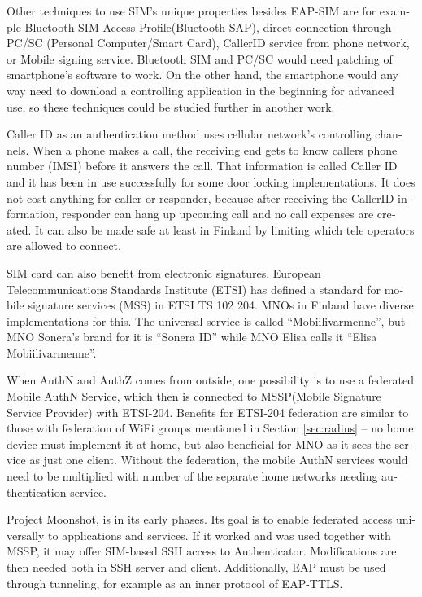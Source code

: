 \documentclass[12pt,a4paper,english]{tutthesis}
\begin{document}
\begin{otherlanguage}{english}
Other techniques  to use SIM's unique properties besides EAP-SIM
are for example Bluetooth SIM Access Profile(Bluetooth  SAP), 
direct connection through PC/SC (Personal\- Computer/Smart\- Card),
CallerID service from phone network, or
Mobile signing service.
Bluetooth SIM and PC/SC would need patching of smartphone's software
to work.  On the other hand, the smartphone would any way need to
download  a controlling application
in the beginning for advanced use, so these techniques could be
studied further in another work.

Caller ID as an authentication method uses cellular network's controlling
channels. When a phone makes a call, the receiving end gets 
to know callers phone number (IMSI) before it answers the call.
That information is called Caller ID and it has been in use
successfully for some door locking implementations. 
It does not cost anything for caller or responder,
because after receiving the CallerID  information, responder can hang
up upcoming call and no call expenses are created.
 It can also be made safe at least in Finland
by limiting which tele operators are allowed to connect.














SIM card can also benefit from electronic signatures.
European Telecommunications Standards Institute (ETSI) has defined a
standard for mobile signature services (MSS) in ETSI TS 102 204.
MNOs in Finland have diverse implementations for this. The universal 
service is called ``Mobiilivarmenne'', but MNO Sonera's brand for it
is ``Sonera ID'' while MNO Elisa calls it ``Elisa Mobiilivarmenne''.

When AuthN and AuthZ comes from outside, one possibility is to use a
federated Mobile AuthN Service, which then is connected to  MSSP(Mobile
Signature Service Provider) with ETSI-204. Benefits for ETSI-204
federation are similar to those with federation of WiFi groups
mentioned in Section \ref{sec:radius} -- no home device must implement it at home,
but also beneficial for  MNO as it sees the service as just one
client.  Without the federation, the mobile AuthN services would need to be
multiplied with number of the separate home networks  needing authentication service.



Project Moonshot\cite{moonshot}, is in its early phases. Its goal is
to enable federated access universally to applications and
services. If it worked and was used together with MSSP, it may offer
SIM-based SSH access to Authenticator. Modifications are then needed 
both in SSH server and client. Additionally, EAP must be used through
tunneling, for example as an inner protocol of EAP-TTLS.


\end{otherlanguage}
\end{document}
